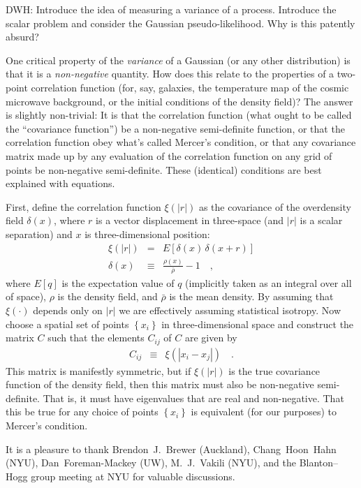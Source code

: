 \documentclass[12pt, letterpaper, preprint]{aastex}
\newcommand{\setof}[1]{\left\{{#1}\right\}}
\begin{document}
DWH: Introduce the idea of measuring a variance of a
process. Introduce the scalar problem and consider the Gaussian
pseudo-likelihood. Why is this patently absurd?

One critical property of the \emph{variance} of a Gaussian (or any other
distribution) is that it is a \emph{non-negative} quantity.
How does this relate to the properties of a two-point correlation
function (for, say, galaxies, the temperature map of the cosmic
microwave background, or the initial conditions of the density field)?
The answer is slightly non-trivial:
It is that the correlation function (what ought to be called the
``covariance function'') be a non-negative semi-definite function, or
that the correlation function obey what's called Mercer's condition,
or that any covariance matrix made up by any evaluation of the
correlation function on any grid of points be non-negative
semi-definite.
These (identical) conditions are best explained with equations.

First, define the correlation function $\xi(|r|)$ as the covariance of
the overdensity field $\delta(x)$, where $r$ is a vector displacement
in three-space (and $|r|$ is a scalar separation) and $x$ is
three-dimensional position:
\begin{eqnarray}
\xi(|r|) &=& E[\delta(x)\,\delta(x+r)]
\\
\delta(x) &\equiv& \frac{\rho(x)}{\bar{\rho}} - 1
\quad ,
\end{eqnarray}
where $E[q]$ is the expectation value of $q$ (implicitly taken as an integral
over all of space),
$\rho$ is the density field,
and $\bar{\rho}$ is the mean density.
By assuming that $\xi(\cdot)$ depends only on $|r|$ we are effectively
assuming statistical isotropy.
Now choose a spatial set of points $\setof{x_i}$ in three-dimensional space
and construct the matrix $C$ such that the elements $C_{ij}$ of $C$
are given by
\begin{eqnarray}
C_{ij} &\equiv& \xi(|x_i - x_j|)
\quad .
\end{eqnarray}
This matrix is manifestly symmetric, but if $\xi(|r|)$ is the true
covariance function of the density field, then this matrix must also
be non-negative semi-definite.
That is, it must have eigenvalues that are real and non-negative.
That this be true for any choice of points $\setof{x_i}$ is equivalent
(for our purposes) to Mercer's condition.

\acknowledgements
It is a pleasure to thank
  Brendon~J.~Brewer (Auckland),
  Chang~Hoon~Hahn (NYU),
  Dan~Foreman-Mackey (UW),
  M.~J.~Vakili (NYU),
  and the Blanton--Hogg group meeting at NYU
for valuable discussions.
\end{document}
